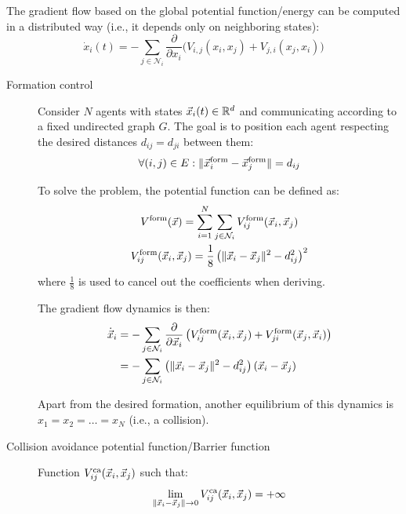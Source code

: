\begin{remark}
    The gradient flow based on the global potential function/energy can be computed in a distributed way (i.e., it depends only on neighboring states):
    \[
        \dot{x}_i(t) = - \sum_{j \in \mathcal{N}_i} \frac{\partial}{\partial x_i} \Big( V_{i,j}(x_i, x_j) + V_{j,i}(x_j, x_i) \Big)
    \]
\end{remark}


\begin{description}
    \item[Formation control] 
        Consider $N$ agents with states ${\vec{x}}_i(t) \in \mathbb{R}^d$ and communicating according to a fixed undirected graph $G$. The goal is to position each agent respecting the desired distances $d_{ij} = d_{ji}$ between them:
        \[
            \forall (i,j) \in E: \Vert {\vec{x}}_i^\text{form} - {\vec{x}}_j^\text{form} \Vert = d_{ij}
        \]

        To solve the problem, the potential function can be defined as:
        \[
            \begin{gathered}
                V^\text{form}({\vec{x}}) = \sum_{i=1}^{N} \sum_{j \in \mathcal{N}_i} V_{ij}^\text{form}({\vec{x}}_i, {\vec{x}}_j) \\
                V_{ij}^\text{form}({\vec{x}}_i, {\vec{x}}_j) = \frac{1}{8} \left( \Vert {\vec{x}}_i - {\vec{x}}_j \Vert^2 - d_{ij}^2 \right)^2
            \end{gathered}
        \]
        where $\frac{1}{8}$ is used to cancel out the coefficients when deriving.

        The gradient flow dynamics is then:
        \[
            \begin{split}
                \dot{{\vec{x}}}_i &= - \sum_{j \in \mathcal{N}_i} \frac{\partial}{\partial {\vec{x}}_i} \left( V_{ij}^\text{form}({\vec{x}}_i, {\vec{x}}_j) + V_{ji}^\text{form}({\vec{x}}_j, {\vec{x}}_i) \right) \\
                &= - \sum_{j \in \mathcal{N}_i} \left( \Vert {\vec{x}}_i - {\vec{x}}_j \Vert^2 - d_{ij}^2 \right)({\vec{x}}_i - {\vec{x}}_j)
            \end{split}
        \]

        \begin{remark}
            Apart from the desired formation, another equilibrium of this dynamics is $x_1 = x_2 = \dots = x_N$ (i.e., a collision).
        \end{remark}

    \item[Collision avoidance potential function/Barrier function] 
        Function $V_{ij}^\text{ca}({\vec{x}}_i, {\vec{x}}_j)$ such that:
        \[
            \lim_{\Vert {\vec{x}}_i - {\vec{x}}_j \Vert \rightarrow 0} V_{ij}^\text{ca}({\vec{x}}_i, {\vec{x}}_j) = +\infty
        \]


\end{description}
